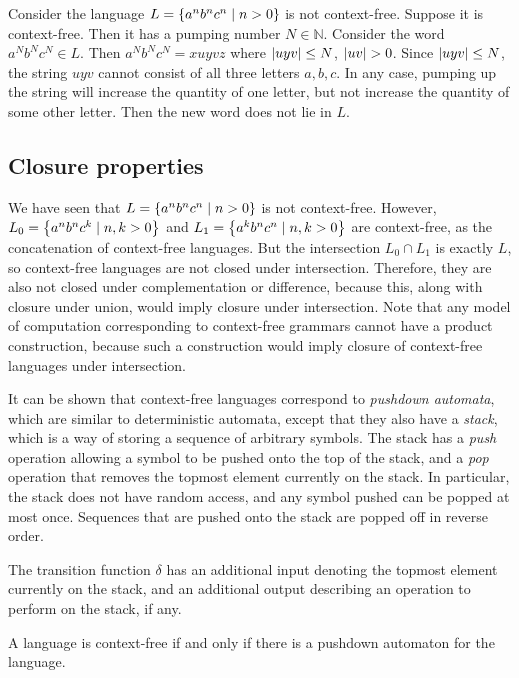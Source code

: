 \begin{example}
	Consider the language \( L = \qty{a^n b^n c^n \mid n > 0} \) is not context-free.
	Suppose it is context-free.
	Then it has a pumping number \( N \in \mathbb N \).
	Consider the word \( a^N b^N c^N \in L \).
	Then \( a^N b^N c^N = xuyvz \) where \( \abs{uyv} \leq N \), \( \abs{uv} > 0 \).
	Since \( \abs{uyv} \leq N \), the string \( uyv \) cannot consist of all three letters \( a, b, c \).
	In any case, pumping up the string will increase the quantity of one letter, but not increase the quantity of some other letter.
	Then the new word does not lie in \( L \).
\end{example}

\subsection{Closure properties}
We have seen that \( L = \qty{a^nb^nc^n \mid n > 0} \) is not context-free.
However, \( L_0 = \qty{a^nb^nc^k \mid n, k > 0} \) and \( L_1 = \qty{a^kb^nc^n \mid n, k > 0} \) are context-free, as the concatenation of context-free languages.
But the intersection \( L_0 \cap L_1 \) is exactly \( L \), so context-free languages are not closed under intersection.
Therefore, they are also not closed under complementation or difference, because this, along with closure under union, would imply closure under intersection.
Note that any model of computation corresponding to context-free grammars cannot have a product construction, because such a construction would imply closure of context-free languages under intersection.

It can be shown that context-free languages correspond to \emph{pushdown automata}, which are similar to deterministic automata, except that they also have a \emph{stack}, which is a way of storing a sequence of arbitrary symbols.
The stack has a \emph{push} operation allowing a symbol to be pushed onto the top of the stack, and a \emph{pop} operation that removes the topmost element currently on the stack.
In particular, the stack does not have random access, and any symbol pushed can be popped at most once.
Sequences that are pushed onto the stack are popped off in reverse order.

The transition function \( \delta \) has an additional input denoting the topmost element currently on the stack, and an additional output describing an operation to perform on the stack, if any.
\begin{theorem}
	A language is context-free if and only if there is a pushdown automaton for the language.
\end{theorem}

